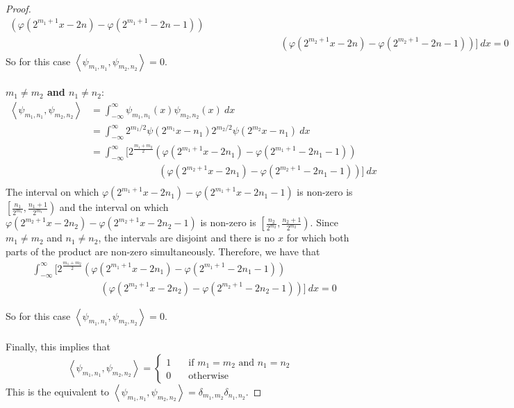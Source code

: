 \documentclass{article}
\newcommand{\parens}[1]{\left(#1\right)}
\newcommand{\abracks}[1]{\left< #1\right>}
\begin{document}
\begin{proof}
\begin{align*}
        \parens{\varphi(2^{m_1+1}x-2n) - \varphi(2^{m_1+1}-2n -1)}\\
        &\qquad\qquad\qquad\quad \parens{\varphi(2^{m_2+1}x-2n) - \varphi(2^{m_2+1}-2n -1)}
        \Bigg]\ dx = 0 
        \end{align*}
        So for this case $\abracks{\psi_{m_1,n_1}, \psi_{m_2,n_2}} = 0$.\\\\
        \textbf{$m_1 \neq m_2$ and $n_1 \neq n_2$}:\\
        \begin{align*}
        \abracks{\psi_{m_1,n_1}, \psi_{m_2,n_2}} 
        &= \int_{-\infty}^\infty \psi_{m_1, n_1}(x)\psi_{m_2,n_2}(x)\ dx \\
        &= \int_{-\infty}^\infty 2^{m_1/2}\psi(2^{m_1}x - n_1)2^{m_2/2}\psi(2^{m_2}x-n_1)\ dx \\
        &= \int_{-\infty}^\infty \Bigg[2^{\frac{m_1+m_2}{2}}
        \parens{\varphi(2^{m_1+1}x-2n_1) - \varphi(2^{m_1+1}-2n_1 -1)}\\
        &\qquad\qquad\qquad\quad \parens{\varphi(2^{m_2+1}x-2n_1) - \varphi(2^{m_2+1}-2n_1-1)}
        \Bigg]\ dx \\
        \end{align*}
        The interval on which $\varphi(2^{m_1+1}x-2n_1) - \varphi(2^{m_1+1}x-2n_1-1)$ 
        is non-zero is $\left[\frac{n_1}{2^{m_1}}, \frac{n_1+1}{2^{m_1}}\right)$ 
        and the interval on which $\varphi(2^{m_2+1}x-2n_2) - \varphi(2^{m_2+1}x-2n_2 -1)$ 
        is non-zero is $\left[\frac{n_2}{2^{m_2}}, \frac{n_2+1}{2^{m_2}}\right)$. Since 
        $m_1\neq m_2$ and $n_1\neq n_2$, the intervals are disjoint and there is no $x$ 
        for which both parts of the product are non-zero simultaneously. Therefore, we 
        have that 
        \begin{align*}
        &\int_{-\infty}^\infty \Bigg[2^{\frac{m_1+m_2}{2}}
        \parens{\varphi(2^{m_1+1}x-2n_1) - \varphi(2^{m_1+1}-2n_1 -1)}\\
        &\qquad\qquad\qquad\quad \parens{\varphi(2^{m_2+1}x-2n_2) - \varphi(2^{m_2+1}-2n_2 -1)}
        \Bigg]\ dx = 0 
        \end{align*}

        So for this case $\abracks{\psi_{m_1,n_1}, \psi_{m_2,n_2}} = 0$.\\\\
        Finally, this implies that 
        $$\abracks{\psi_{m_1,n_1}, \psi_{m_2,n_2}} = \left\{
        \begin{array}{ll}
        1 & \quad \text{if }m_1 = m_2 \text{ and }n_1 = n_2 \\
        0 & \quad \text{otherwise}    
        \end{array}    
        \right.$$
        This is the equivalent to $\abracks{\psi_{m_1,n_1}, \psi_{m_2,n_2}} = \delta_{m_1,m_2}
        \delta_{n_1,n_2}$.
        \end{proof} 
\end{document}
